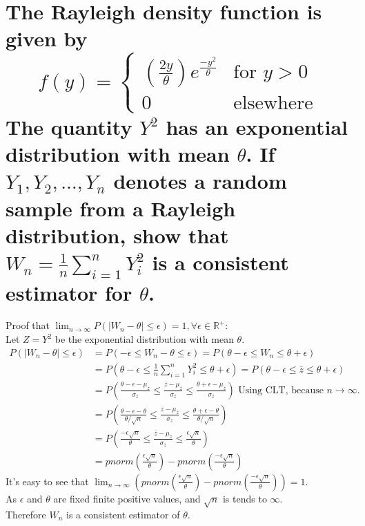 \documentclass[10pt, letterpaper, titlepage]{article}
\newcommand\abs[1]{\left|#1\right|}
\newcommand{\mz}{\overline{z}}
\newcommand{\R}{\mathbb{R}}
\begin{document}
    \section[]{The Rayleigh density function is given by
        \[
            f(y) = 
            \begin{cases}
                (\frac{2y}{\theta})e^{\frac{-y^2}{\theta}} &\text{for } y > 0 \\
                0 &\text{elsewhere}
            \end{cases}
        \]
        The quantity $Y^2$ has an exponential distribution with mean $\theta$. If $Y_1,Y_2,\hdots,Y_n$ denotes a
        random sample from a Rayleigh distribution, show that $W_n = \frac{1}{n}\sum_{i=1}^n Y_i^2$ is a consistent
        estimator for $\theta$.}
        Proof that $\lim_{n \to \infty}P(\abs{W_n - \theta} \leq \epsilon) = 1, \forall \epsilon \in \R^+$:\\
        Let $Z = Y^2$ be the exponential distribution with mean $\theta$.
        \begin{align*}
            P(\abs{W_n - \theta} \leq \epsilon)
            &= P(-\epsilon \leq W_n - \theta \leq \epsilon)
            = P(\theta-\epsilon \leq W_n \leq \theta+\epsilon)\\
            &= P(\theta-\epsilon \leq \frac{1}{n}\sum_{i=1}^n Y_i^2 \leq \theta+\epsilon)
            = P(\theta-\epsilon \leq \mz \leq \theta+\epsilon)\\
            &= P(\frac{\theta-\epsilon - \mu_{\mz}}{\sigma_{\mz}} 
            \leq \frac{\mz - \mu_{\mz}}{\sigma_{\mz}} 
            \leq \frac{\theta+\epsilon - \mu_{\mz}}{\sigma_{\mz}})
            \text{ Using CLT, because $n \to \infty$.}\\
            &= P(\frac{\theta-\epsilon - \theta}{\theta /\sqrt{n}} 
            \leq \frac{\mz - \mu_{\mz}}{\sigma_{\mz}} 
            \leq \frac{\theta+\epsilon - \theta}{\theta /\sqrt{n}})\\
            &= P(\frac{-\epsilon \sqrt{n}}{\theta} 
            \leq \frac{\mz - \mu_{\mz}}{\sigma_{\mz}} 
            \leq \frac{\epsilon \sqrt{n}}{\theta})\\
            &= pnorm(\frac{\epsilon \sqrt{n}}{\theta}) - pnorm(\frac{-\epsilon \sqrt{n}}{\theta}) 
        \end{align*}
        It's easy to see that 
        $\lim_{n \to \infty}(pnorm(\frac{\epsilon \sqrt{n}}{\theta}) - pnorm(\frac{-\epsilon \sqrt{n}}{\theta})) = 1$.\\
        As $\epsilon$ and $\theta$ are fixed finite positive values, and $\sqrt{n}$ is tends to $\infty$.\\
        Therefore $W_n$ is a consistent estimator of $\theta$.
\end{document}
